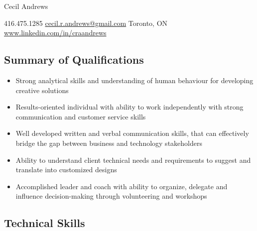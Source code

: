 \documentclass{article}
\begin{document}
\begin{center}
   
    \Huge\textcolor{ablue}{Cecil Andrews}

\end{center}

\begin{center}
 
 416.475.1285 \vert  \href{mailto:cecil.r.andrews@gmail.com}{cecil.r.andrews@gmail.com} \vert  Toronto, ON \vert \href{www.linkedin.com/in/craandrews}{www.linkedin.com/in/craandrews}

\end{center}

\begin{center}
\section*{Summary of Qualifications}
\end{center}


\begin{flushleft}
\begin{itemize}
\item Strong analytical skills and understanding of human behaviour for developing creative solutions\\
\item Results-oriented individual with ability to work independently with strong communication and customer service skills \\
\item Well developed written and verbal communication skills, that can effectively bridge the gap between business and technology stakeholders \\
\item Ability to understand client technical needs and requirements to suggest and translate into customized designs\\
\item Accomplished leader and  coach with ability to organize, delegate and influence decision-making through volunteering and workshops
\end{itemize}
\end{flushleft}

\begin{center}
\section*{Technical Skills}
\end{center}
\end{document}
